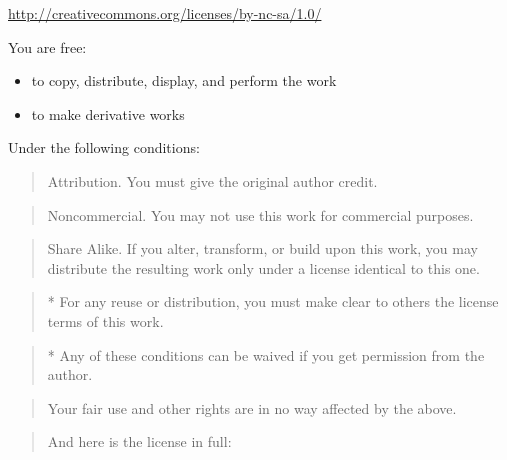 \href{http://creativecommons.org/licenses/by-nc-sa/1.0/}{http://creativecommons.org/licenses/by-nc-sa/1.0/}

You are free:

\begin{itemize}
\item
to copy, distribute, display, and perform the work
\item to make derivative works
\end{itemize}

Under the following conditions:

\begin{quote}
Attribution. You must give the original author credit.
\end{quote}
\begin{quote}
Noncommercial. You may not use this work for commercial purposes.
\end{quote}
\begin{quote}
Share Alike. If you alter, transform, or build upon this work, you
may distribute the resulting work only under a license identical to
this one.
\end{quote}
\begin{quote}
* For any reuse or distribution, you must make clear to others the
license terms of this work.
\end{quote}
\begin{quote}
* Any of these conditions can be waived if you get permission from
the author.
\end{quote}
\begin{quote}
Your fair use and other rights are in no way affected by the above.
\end{quote}
\begin{quote}
And here is the license in full:
\end{quote}
